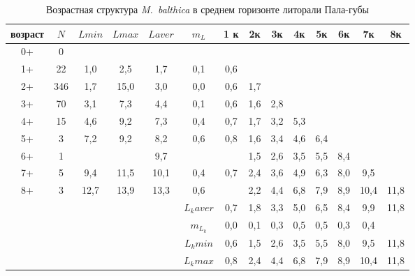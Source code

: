 \begin{landscape}
\begin{table}[h]
\caption{Возрастная структура {\it M.~balthica} в среднем горизонте литорали Пала-губы }
\label{tab:Pala_sgl_growth_matrix}
\begin{tabular}{|c|c|cc|cc|cccccccc|}
    \hline
возраст & $N$   & $L min$ & $L max$ & $L aver$ & $m_L$   & 1 к & 2к  & 3к  & 4к  & 5к  & 6к  & 7к   & 8к   \\ \hline
0+      & 0   &       &       &         &         &     &     &     &     &     &     &      &      \\
1+      & 22  & 1,0   & 2,5   & 1,7     & 0,1     & 0,6 &     &     &     &     &     &      &      \\
2+      & 346 & 1,7   & 15,0  & 3,0     & 0,0     & 0,6 & 1,7 &     &     &     &     &      &      \\
3+      & 70  & 3,1   & 7,3   & 4,4     & 0,1     & 0,6 & 1,6 & 2,8 &     &     &     &      &      \\
4+      & 15  & 4,6   & 9,2   & 7,3     & 0,4     & 0,7 & 1,7 & 3,2 & 5,3 &     &     &      &      \\
5+      & 3   & 7,2   & 9,2   & 8,2     & 0,6     & 0,8 & 1,6 & 3,4 & 4,6 & 6,4 &     &      &      \\
6+      & 1   &     &     & 9,7     &         &   & 1,5 & 2,6 & 3,5 & 5,5 & 8,4 &      &      \\
7+      & 5   & 9,4   & 11,5  & 10,1    & 0,4     & 0,7 & 2,4 & 3,6 & 4,9 & 6,3 & 8,0 & 9,5  &      \\
8+      & 3   & 12,7  & 13,9  & 13,3    & 0,6     &   & 2,2 & 4,4 & 6,8 & 7,9 & 8,9 & 10,4 & 11,8 \\ \hline
        &     &       &       &         & $L_k aver$ & 0,7 & 1,8 & 3,3 & 5,0 & 6,5 & 8,4 & 9,9  & 11,8 \\
        &     &       &       &         & $m_{L_k}$  & 0,0 & 0,1 & 0,3 & 0,5 & 0,5 & 0,3 & 0,4  &      \\
        &     &       &       &         & $L_k min$  & 0,6 & 1,5 & 2,6 & 3,5 & 5,5 & 8,0 & 9,5  & 11,8 \\
        &     &       &       &         & $L_k max$  & 0,8 & 2,4 & 4,4 & 6,8 & 7,9 & 8,9 & 10,4 & 11,8 \\ \hline
\end{tabular}
\end{table}


\end{landscape}
